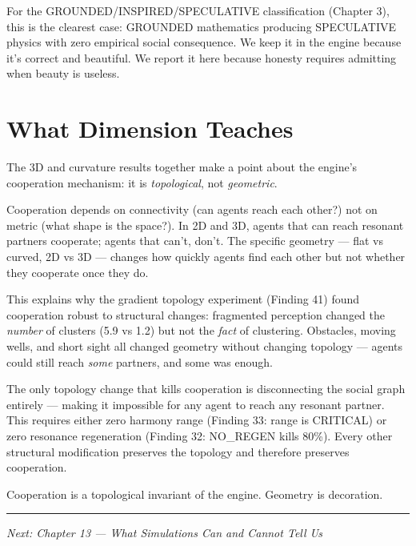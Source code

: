 For the GROUNDED/INSPIRED/SPECULATIVE classification (Chapter 3), this is the clearest case: GROUNDED mathematics producing SPECULATIVE physics with zero empirical social consequence. We keep it in the engine because it's correct and beautiful. We report it here because honesty requires admitting when beauty is useless.

\section{What Dimension Teaches}\label{what-dimension-teaches}

The 3D and curvature results together make a point about the engine's cooperation mechanism: it is \emph{topological}, not \emph{geometric}.

Cooperation depends on connectivity (can agents reach each other?) not on metric (what shape is the space?). In 2D and 3D, agents that can reach resonant partners cooperate; agents that can't, don't. The specific geometry --- flat vs curved, 2D vs 3D --- changes how quickly agents find each other but not whether they cooperate once they do.

This explains why the gradient topology experiment (Finding 41) found cooperation robust to structural changes: fragmented perception changed the \emph{number} of clusters (5.9 vs 1.2) but not the \emph{fact} of clustering. Obstacles, moving wells, and short sight all changed geometry without changing topology --- agents could still reach \emph{some} partners, and some was enough.

The only topology change that kills cooperation is disconnecting the social graph entirely --- making it impossible for any agent to reach any resonant partner. This requires either zero harmony range (Finding 33: range is CRITICAL) or zero resonance regeneration (Finding 32: NO\_REGEN kills 80\%). Every other structural modification preserves the topology and therefore preserves cooperation.

Cooperation is a topological invariant of the engine. Geometry is decoration.

\begin{center}\rule{0.5\linewidth}{0.5pt}\end{center}

\emph{Next: Chapter 13 --- What Simulations Can and Cannot Tell Us}
